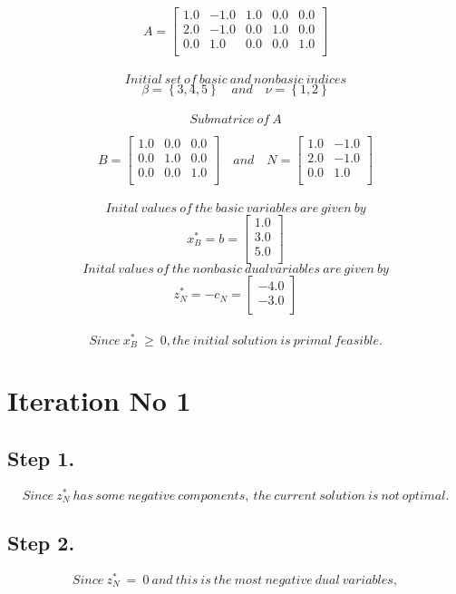 
\[
A  =
\begin{bmatrix}
1.0 & -1.0 & 1.0 & 0.0 & 0.0 \\ 2.0 & -1.0 & 0.0 & 1.0 & 0.0 \\ 0.0 & 1.0 & 0.0 & 0.0 & 1.0 \\ 
\end{bmatrix}
\]
\\
\[ Initial\ set\  of\  basic\  and\  nonbasic\  indices \]
\[
\beta= \left\{3, 4, 5\right\} \quad and \quad  \nu=\left\{1, 2\right\}
\]
\\
\[
Submatrice\ of \ A
\]

\[
B =
\begin{bmatrix}
1.0 & 0.0 & 0.0 \\ 0.0 & 1.0 & 0.0 \\ 0.0 & 0.0 & 1.0 \\ 
\end{bmatrix} \quad and \quad
\mathit{N} =
\begin{bmatrix}
1.0 & -1.0 \\ 2.0 & -1.0 \\ 0.0 & 1.0 \\ 
\end{bmatrix}
\]
\\
\[
Inital\ values\ of\ the\ basic\ variables\ are\ given\ by
\]
\[
x_B^* = b =
\begin{bmatrix}
1.0 \\ 3.0 \\ 5.0 \\ 
\end{bmatrix}
\]
\[
Inital\ values\ of\ the\ nonbasic\ dual variables\ are\ given\ by
\]
\[
z_\mathit{N}^*= -c_\mathit{N} =
\begin{bmatrix}
-4.0 \\ -3.0 \\ 
\end{bmatrix}
\]
\\
\[
Since\ x_B^*\  \geq \  0, the\ initial\ solution\ is\ primal\ feasible.
\]
\section*{Iteration No 1}
\subsection{Step 1.}
\[
Since\ z_\mathit{N}^*\ has\ some\ negative\ components,\ the\ current\ solution\ is\ not\ optimal.
\]
\subsection{Step 2.}
\[
Since\ z_\mathit{N}^*\ = \ 0\ and\ this\ is\ the\ most\ negative\ dual\ variables,
\]

